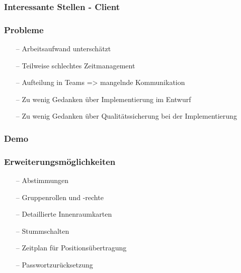 \documentclass[aspectratio=1610]{beamer}
\begin{document}
  \begin{frame}[plain]
      \frametitle{\textbf{Interessante Stellen - Client}}
  \end{frame}

  \begin{frame}[plain]
      \frametitle{\textbf{Probleme}}
      \begin{itemize}
        \item[--] Arbeitsaufwand unterschätzt
        \item[--] Teilweise schlechtes Zeitmanagement
        \item[--] Aufteilung in Teams => mangelnde Kommunikation
        \item[--] Zu wenig Gedanken über Implementierung im Entwurf
        \item[--] Zu wenig Gedanken über Qualitätssicherung bei der Implementierung
      \end{itemize}
  \end{frame}


  \begin{frame}[plain]
      \frametitle{\textbf{Demo}}

  \end{frame}

  \begin{frame}[plain]
      \frametitle{\textbf{Erweiterungsmöglichkeiten}}
        \begin{itemize}
          \item[--] Abstimmungen
          \item[--] Gruppenrollen und -rechte
          \item[--] Detaillierte Innenraumkarten
          \item[--] Stummschalten
          \item[--] Zeitplan für Positionsübertragung
          \item[--] Passwortzurücksetzung
        \end{itemize}
  \end{frame}
\end{document}
